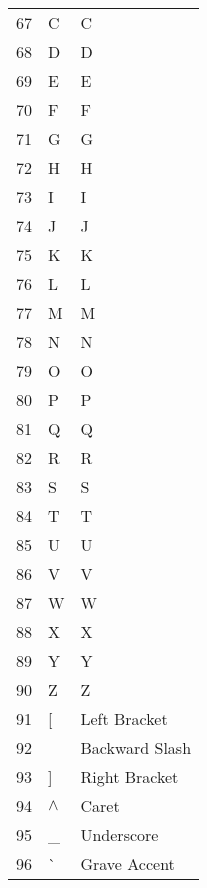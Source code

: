 \begin{description}
\begin{longtable}{lll}
      67 & C & C \\
      68 & D & D \\
      69 & E & E \\
      70 & F & F \\
      71 & G & G \\
      72 & H & H \\
      73 & I & I \\
      74 & J & J \\
      75 & K & K \\
      76 & L & L \\
      77 & M & M \\
      78 & N & N \\
      79 & O & O \\
      80 & P & P \\
      81 & Q & Q \\
      82 & R & R \\
      83 & S & S \\
      84 & T & T \\
      85 & U & U \\
      86 & V & V \\
      87 & W & W \\
      88 & X & X \\
      89 & Y & Y \\
      90 & Z & Z \\

      91 & [ & Left Bracket \\
      92 & \ & Backward Slash \\
      93 & ] & Right Bracket \\
      94 & $\wedge$ & Caret  \\
      95 & \_ & Underscore  \\
      96 & \`{} & Grave Accent   \\



\end{longtable}
\end{description}
